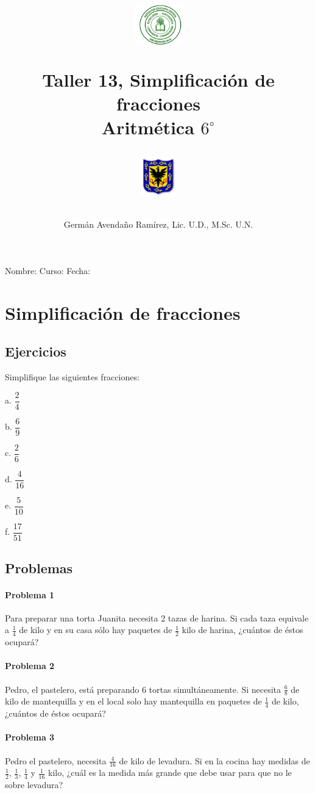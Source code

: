 \documentclass[10pt,twoside]{article}
\author{Germ\'an Avenda\~no Ram\'irez, Lic. U.D., M.Sc. U.N.}
\title{\begin{minipage}{.2\textwidth}
\includegraphics[height=1.75cm]{Images/logo-colegio.png}\end{minipage}
\begin{minipage}{.55\textwidth}
\begin{center}
Taller 13, Simplificación de fracciones  \\
Aritmética $6^{\circ}$
\end{center}
\end{minipage}\hfill
\begin{minipage}{.2\textwidth}
\includegraphics[height=1.75cm]{Images/logo-sed.png} 
\end{minipage}}
\date{}
\begin{document}
\maketitle
Nombre: \hrulefill Curso: \underline{\hspace*{44pt}} Fecha: \underline{\hspace*{2.5cm}}

\section*{Simplificaci\'{o}n de fracciones}
\subsection*{Ejercicios}
Simplifique las siguientes fracciones:
\begin{enumerate}
\begin{multicols}{3}
\item[a.] $\dfrac{2}{4}$
\item[b.] $\dfrac{6}{9}$
\item[c.] $\dfrac{2}{6}$
\item[d.] $\dfrac{4}{16}$
\item[e.] $\dfrac{5}{10}$
\item[f.] $\dfrac{17}{51}$
\end{multicols}
\end{enumerate}
\subsection*{Problemas}
\paragraph*{Problema 1}
Para preparar una torta Juanita necesita 2 tazas de harina. Si cada taza equivale a $\frac{1}{4}$ de kilo y en su casa sólo hay paquetes de $\frac{1}{2}$ kilo de harina, ¿cuántos de éstos ocupará?
\paragraph*{Problema 2}
Pedro, el pastelero, está preparando 6 tortas simultáneamente. Si necesita $\frac{6}{8}$ de kilo de mantequilla y en el local solo hay mantequilla en paquetes de $\frac{1}{4}$ de kilo, ¿cuántos de éstos ocupará? 
\paragraph*{Problema 3}
Pedro el pastelero, necesita $\frac{4}{16}$ de kilo de levadura. Si en la cocina hay medidas de $\frac{1}{2}$, $\frac{1}{3}$, $\frac{1}{4}$ y $\frac{1}{16}$ kilo, ¿cuál es la medida más grande que debe usar para que no le sobre levadura?
\end{document}
